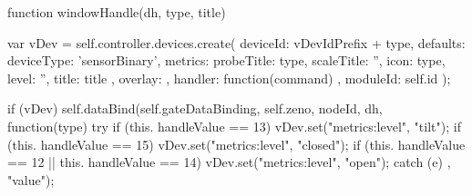 \begin{listingverbatim}
function windowHandle(dh, type, title) {
	var vDev = self.controller.devices.create({
	deviceId: vDevIdPrefix + type,
	defaults: {
		deviceType: 'sensorBinary',
		metrics: {
			probeTitle: type,
			scaleTitle: '',
			icon: type,
			level: '',
			title: title
		}
	},
	overlay: {},
	handler: function(command) {},
	moduleId: self.id
});

if (vDev) {
	self.dataBind(self.gateDataBinding, self.zeno, nodeId, dh, 
	function(type) {
		try {
			if (this. handleValue == 13)
				vDev.set("metrics:level", "tilt");
			if (this. handleValue == 15)
				vDev.set("metrics:level", "closed");
			if (this. handleValue == 12 || this. handleValue == 14)
				vDev.set("metrics:level", "open");
		} catch (e) {}
	}, "value");
}
}
\end{listingverbatim}
